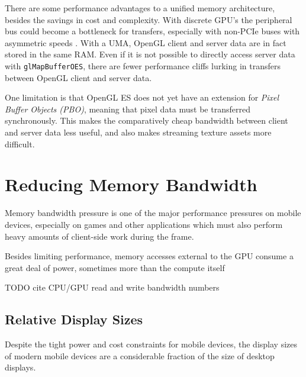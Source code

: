 There are some performance advantages to a unified memory architecture, besides
the savings in cost and complexity.  With discrete GPU's the peripheral bus
could become a bottleneck for transfers, especially with non-PCIe buses with
asymmetric speeds \cite{Elhasson05}.  With a UMA, OpenGL client and server data
are in fact stored in the same RAM.  Even if it is not possible to directly
access server data with \texttt{glMapBufferOES}, there are fewer performance
cliffs lurking in transfers between OpenGL client and server data.


One limitation is that OpenGL ES does not yet have an extension for
\textit{Pixel Buffer Objects (PBO)}, meaning that pixel data must be
transferred synchronously.  This makes the comparatively cheap bandwidth
between client and server data less useful, and also makes streaming texture
assets more difficult.

\section{Reducing Memory
Bandwidth}\label{Jon-McCaffrey:Reducing-Memory-Bandwidth}


Memory bandwidth pressure is one of the major performance pressures on mobile
devices, especially on games and other applications which must also perform
heavy amounts of client-side work during the frame.

Besides limiting performance, memory accesses external to the GPU consume a
great deal of power, sometimes more than the compute itself \cite{Antochi04}

TODO cite CPU/GPU read and write bandwidth numbers

\subsection{Relative Display Sizes}\label{Jon-McCaffrey:relative-display-sizes}

 

Despite the tight power and cost constraints for mobile devices, the display
sizes of modern mobile devices are a considerable fraction of the size of
desktop displays.  

